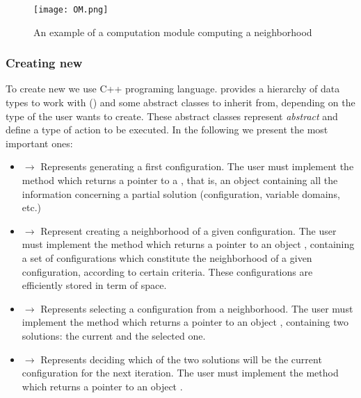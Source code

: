 \begin{figure}
	\centering	
	\texttt{[image: OM.png]}
	\caption{An example of a computation module computing a neighborhood}\label{fig:om}
\end{figure}

\subsubsection{Creating new \oms}
\label{subsubsec:creatingoms}

To create new \oms{} we use C++ programing language. \posl{} provides a hierarchy of data types to work with () and some abstract classes to inherit from, depending on the type of \om{} the user wants to create. These abstract classes represent {\it abstract} \om{} and define a type of action to be executed. In the following we present the most important ones:

\begin{itemize}
\item {} $\rightarrow$ Represents \oms{} generating a first configuration. The user must implement the method  which returns a pointer to a , that is, an object containing all the information concerning a partial solution (configuration, variable domains, etc.)
\item {} $\rightarrow$ Represent \oms{} creating a neighborhood of a given configuration. The user must implement the method  which returns a pointer to an object , containing a set of configurations which constitute the neighborhood of a given configuration, according to certain criteria. These configurations are efficiently stored in term of space.
\item {} $\rightarrow$ Represents \oms{} selecting a configuration from a neighborhood. The user must implement the method  which returns a pointer to an object , containing two solutions: the current and the selected one.
\item {} $\rightarrow$ Represents \oms{} deciding which of the two solutions will be the current configuration for the next iteration. The user must implement the method  which returns a pointer to an object .
\end{itemize}

